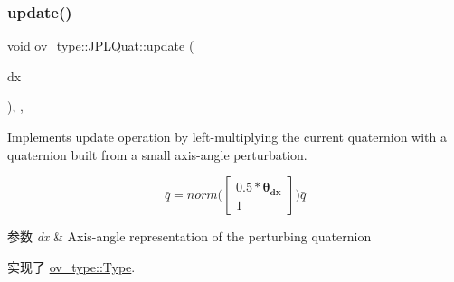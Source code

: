 \subsubsection{\texorpdfstring{update()}{update()}}
{\footnotesize\ttfamily void ov\+\_\+type\+::\+J\+P\+L\+Quat\+::update (\begin{DoxyParamCaption}\item[{const Eigen\+::\+Vector\+Xd \&}]{dx }\end{DoxyParamCaption})\hspace{0.3cm}{\ttfamily [inline]}, {\ttfamily [override]}, {\ttfamily [virtual]}}



Implements update operation by left-\/multiplying the current quaternion with a quaternion built from a small axis-\/angle perturbation. 

\[ \bar{q}=norm\Big(\begin{bmatrix} 0.5*\mathbf{\theta_{dx}} \\ 1 \end{bmatrix}\Big) \hat{\bar{q}} \]


\begin{DoxyParams}{参数}
{\em dx} & Axis-\/angle representation of the perturbing quaternion \\
\hline
\end{DoxyParams}


实现了 \hyperlink{classov__type_1_1Type_a4e133d50af35f07bd97f73590fe31000}{ov\+\_\+type\+::\+Type}.

